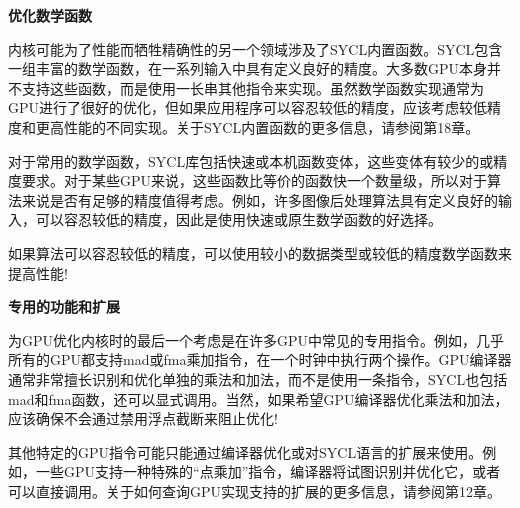 \hspace*{\fill} \par %
\textbf{优化数学函数}

内核可能为了性能而牺牲精确性的另一个领域涉及了SYCL内置函数。SYCL包含一组丰富的数学函数，在一系列输入中具有定义良好的精度。大多数GPU本身并不支持这些函数，而是使用一长串其他指令来实现。虽然数学函数实现通常为GPU进行了很好的优化，但如果应用程序可以容忍较低的精度，应该考虑较低精度和更高性能的不同实现。关于SYCL内置函数的更多信息，请参阅第18章。\par

对于常用的数学函数，SYCL库包括快速或本机函数变体，这些变体有较少的或精度要求。对于某些GPU来说，这些函数比等价的函数快一个数量级，所以对于算法来说是否有足够的精度值得考虑。例如，许多图像后处理算法具有定义良好的输入，可以容忍较低的精度，因此是使用快速或原生数学函数的好选择。\par

\begin{tcolorbox}[colback=red!5!white,colframe=red!75!black]
如果算法可以容忍较低的精度，可以使用较小的数据类型或较低的精度数学函数来提高性能!
\end{tcolorbox}

\hspace*{\fill} \par %
\textbf{专用的功能和扩展}

为GPU优化内核时的最后一个考虑是在许多GPU中常见的专用指令。例如，几乎所有的GPU都支持mad或fma乘加指令，在一个时钟中执行两个操作。GPU编译器通常非常擅长识别和优化单独的乘法和加法，而不是使用一条指令，SYCL也包括mad和fma函数，还可以显式调用。当然，如果希望GPU编译器优化乘法和加法，应该确保不会通过禁用浮点截断来阻止优化!\par

其他特定的GPU指令可能只能通过编译器优化或对SYCL语言的扩展来使用。例如，一些GPU支持一种特殊的“点乘加”指令，编译器将试图识别并优化它，或者可以直接调用。关于如何查询GPU实现支持的扩展的更多信息，请参阅第12章。\par








